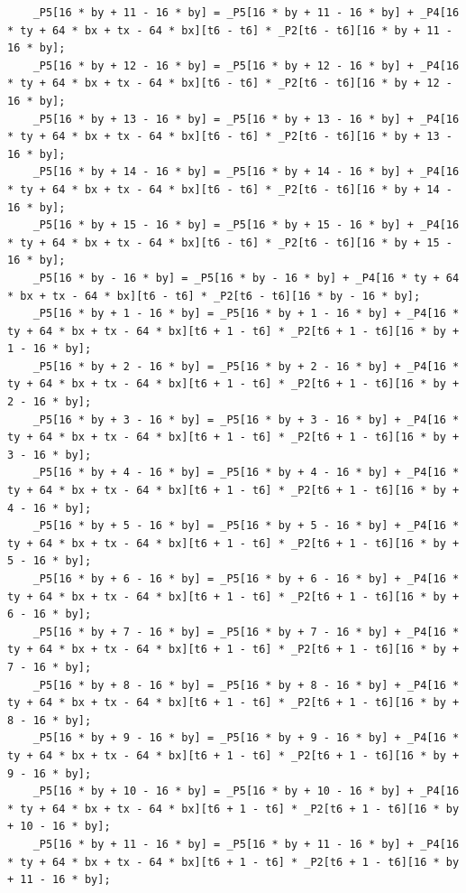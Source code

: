 \documentclass[msthesis,justified,copyright,final,numbers,sort&compress,
gsmodern,amstex,natbib]{uothesis}
\begin{document}
\begin{lstlisting}
    _P5[16 * by + 11 - 16 * by] = _P5[16 * by + 11 - 16 * by] + _P4[16 * ty + 64 * bx + tx - 64 * bx][t6 - t6] * _P2[t6 - t6][16 * by + 11 - 16 * by];
    _P5[16 * by + 12 - 16 * by] = _P5[16 * by + 12 - 16 * by] + _P4[16 * ty + 64 * bx + tx - 64 * bx][t6 - t6] * _P2[t6 - t6][16 * by + 12 - 16 * by];
    _P5[16 * by + 13 - 16 * by] = _P5[16 * by + 13 - 16 * by] + _P4[16 * ty + 64 * bx + tx - 64 * bx][t6 - t6] * _P2[t6 - t6][16 * by + 13 - 16 * by];
    _P5[16 * by + 14 - 16 * by] = _P5[16 * by + 14 - 16 * by] + _P4[16 * ty + 64 * bx + tx - 64 * bx][t6 - t6] * _P2[t6 - t6][16 * by + 14 - 16 * by];
    _P5[16 * by + 15 - 16 * by] = _P5[16 * by + 15 - 16 * by] + _P4[16 * ty + 64 * bx + tx - 64 * bx][t6 - t6] * _P2[t6 - t6][16 * by + 15 - 16 * by];
    _P5[16 * by - 16 * by] = _P5[16 * by - 16 * by] + _P4[16 * ty + 64 * bx + tx - 64 * bx][t6 - t6] * _P2[t6 - t6][16 * by - 16 * by];
    _P5[16 * by + 1 - 16 * by] = _P5[16 * by + 1 - 16 * by] + _P4[16 * ty + 64 * bx + tx - 64 * bx][t6 + 1 - t6] * _P2[t6 + 1 - t6][16 * by + 1 - 16 * by];
    _P5[16 * by + 2 - 16 * by] = _P5[16 * by + 2 - 16 * by] + _P4[16 * ty + 64 * bx + tx - 64 * bx][t6 + 1 - t6] * _P2[t6 + 1 - t6][16 * by + 2 - 16 * by];
    _P5[16 * by + 3 - 16 * by] = _P5[16 * by + 3 - 16 * by] + _P4[16 * ty + 64 * bx + tx - 64 * bx][t6 + 1 - t6] * _P2[t6 + 1 - t6][16 * by + 3 - 16 * by];
    _P5[16 * by + 4 - 16 * by] = _P5[16 * by + 4 - 16 * by] + _P4[16 * ty + 64 * bx + tx - 64 * bx][t6 + 1 - t6] * _P2[t6 + 1 - t6][16 * by + 4 - 16 * by];
    _P5[16 * by + 5 - 16 * by] = _P5[16 * by + 5 - 16 * by] + _P4[16 * ty + 64 * bx + tx - 64 * bx][t6 + 1 - t6] * _P2[t6 + 1 - t6][16 * by + 5 - 16 * by];
    _P5[16 * by + 6 - 16 * by] = _P5[16 * by + 6 - 16 * by] + _P4[16 * ty + 64 * bx + tx - 64 * bx][t6 + 1 - t6] * _P2[t6 + 1 - t6][16 * by + 6 - 16 * by];
    _P5[16 * by + 7 - 16 * by] = _P5[16 * by + 7 - 16 * by] + _P4[16 * ty + 64 * bx + tx - 64 * bx][t6 + 1 - t6] * _P2[t6 + 1 - t6][16 * by + 7 - 16 * by];
    _P5[16 * by + 8 - 16 * by] = _P5[16 * by + 8 - 16 * by] + _P4[16 * ty + 64 * bx + tx - 64 * bx][t6 + 1 - t6] * _P2[t6 + 1 - t6][16 * by + 8 - 16 * by];
    _P5[16 * by + 9 - 16 * by] = _P5[16 * by + 9 - 16 * by] + _P4[16 * ty + 64 * bx + tx - 64 * bx][t6 + 1 - t6] * _P2[t6 + 1 - t6][16 * by + 9 - 16 * by];
    _P5[16 * by + 10 - 16 * by] = _P5[16 * by + 10 - 16 * by] + _P4[16 * ty + 64 * bx + tx - 64 * bx][t6 + 1 - t6] * _P2[t6 + 1 - t6][16 * by + 10 - 16 * by];
    _P5[16 * by + 11 - 16 * by] = _P5[16 * by + 11 - 16 * by] + _P4[16 * ty + 64 * bx + tx - 64 * bx][t6 + 1 - t6] * _P2[t6 + 1 - t6][16 * by + 11 - 16 * by];

\end{lstlisting}
\end{document}
